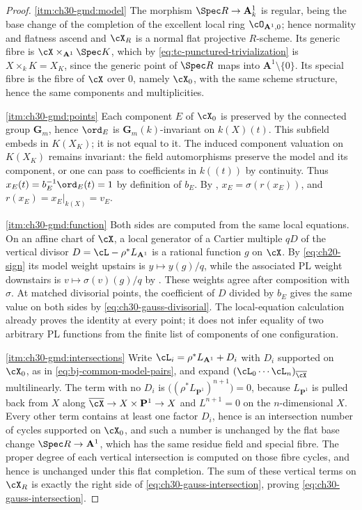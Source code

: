 \begin{proof}
\cref{itm:ch30-gmd:model}  The morphism $\Spec R\to\mathbf A^1_k$ is
regular, being the base change of the completion of the excellent local ring
$\cO_{\mathbf A^1,0}$; hence normality and flatness ascend and $\cX_R$
is a normal flat projective $R$-scheme.  Its generic fibre is
$\cX\times_{\mathbf A^1}\Spec K$, which by
\eqref{eq:tc-punctured-trivialization} is $X\times_kK=X_K$, since the
generic point of $\Spec R$ maps into $\mathbf A^1\setminus\{0\}$.  Its
special fibre is the fibre of $\cX$ over $0$, namely $\cX_0$, with the
same scheme structure, hence the same components and multiplicities.

\cref{itm:ch30-gmd:points}  Each component $E$ of $\cX_0$ is preserved by
the connected group $\mathbf G_m$, hence $\ord_E$ is
$\mathbf G_m(k)$-invariant on $k(X)(t)$.
This subfield embeds in $K(X_K)$; it is not equal to it.
The induced component valuation on $K(X_K)$ remains invariant:
the field automorphisms preserve the model and its component, or one
can pass to coefficients in $k((t))$ by continuity.  Thus
$x_E(t)=b_E^{-1}\ord_E(t)=1$ by definition of $b_E$.  By
, $x_E=\sigma(r(x_E))$, and
$r(x_E)=x_E|_{k(X)}=v_E$.

\cref{itm:ch30-gmd:function}  Both sides are computed from the same local
equations.  On an affine chart of $\cX$, a local generator of
a Cartier multiple $qD$ of the vertical divisor
$D=\cL-\rho^*L_{\mathbf A^1}$ is a rational function $g$ on $\cX$.
By \eqref{eq:ch20-sign} its model weight upstairs is
$y\mapsto y(g)/q$, while the associated PL weight downstairs is
$v\mapsto\sigma(v)(g)/q$ by .
These weights agree after composition with $\sigma$.
At matched divisorial points, the coefficient of $D$ divided by $b_E$
gives the same value on both sides by
\eqref{eq:ch30-gauss-divisorial}.  The local-equation calculation already proves the
identity at every point; it does not infer equality of two arbitrary
PL functions from the finite list of components of one configuration.

\cref{itm:ch30-gmd:intersections}  Write
$\cL_i=\rho^*L_{\mathbf A^1}+D_i$ with $D_i$ supported on $\cX_0$, as
in \eqref{eq:bj-common-model-pairs}, and expand
$(\cL_0\cdots\cL_n)_{\overline\cX}$ multilinearly.  The term with no
$D_i$ is $\bigl((\rho^*L_{\mathbf P^1})^{n+1}\bigr)=0$, because
$L_{\mathbf P^1}$ is pulled back from $X$ along
$\overline\cX\to X\times\mathbf P^1\to X$ and $L^{n+1}=0$ on the
$n$-dimensional $X$.  Every other term contains at least one factor
$D_i$, hence is an intersection number of cycles supported on $\cX_0$,
and such a number is unchanged by the flat base change
$\Spec R\to\mathbf A^1$, which has the same residue field and special fibre.  The proper
degree of each vertical intersection is computed on those fibre
cycles, and hence is unchanged under this flat completion.
The sum of these vertical terms on $\cX_R$ is exactly the right
side of \eqref{eq:ch30-gauss-intersection}, proving
\eqref{eq:ch30-gauss-intersection}.


\end{proof}
